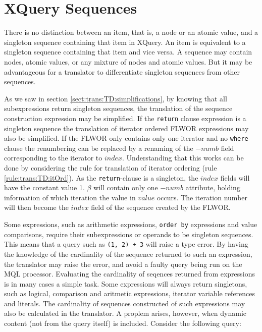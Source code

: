\section{XQuery Sequences}
\label{sect:disc:singelton}

There is no distinction between an item, that is, a node or an atomic value, and a singleton sequence containing
that item in XQuery. An item is equivalent to a singleton sequence containing that item and vice versa. A sequence
may contain nodes, atomic values, or any mixture of nodes and atomic values. But it may be advantageous for a
translator to differentiate singleton sequences from other sequences. 

As we saw in section \ref{sect:trans:TD:simplifications}, by knowing that all subexpressions return singleton
sequences, the translation of the sequence construction expression may be simplified. If the \texttt{return}
clause expression is a singleton sequence the translation of iterator ordered FLWOR expressions may also be
simplified. If the FLWOR only contains only one iterator and no \texttt{where}-clause the renumbering can be
replaced by a renaming of the $-numb$ field corresponding to the iterator to $index$. Understanding that this
works can be done by considering the rule for translation of iterator ordering (rule \ref{rule:trans:TD:itOrd}).
As the \texttt{return}-clause is a singleton, the $index$ fields will have the constant value 1. $\beta$ will
contain only one $-numb$ attribute, holding information of which iteration the value in $value$ occurs. The
iteration number will then become the $index$ field of the sequence created by the FLWOR.

Some expressions, such as arithmetic expressions, \texttt{order by} expressions and value comparisons, require
their subexpressions or operands to be singleton sequences. This means that a query such as \texttt{(1, 2) + 3}
will raise a type error. By having the knowledge of the cardinality of the sequence returned to such an
expression, the translator may raise the error, and avoid a faulty query being run on the MQL processor.
Evaluating the cardinality of seqences returned from expressions is in many cases a simple task. Some expressions
will always return singletons, such as logical, comparison and aritmetic expressions, iterator variable references
and literals. The cardinality of sequences constructed of such expressions may also be calculated in the
translator. A proplem arises, however, when dynamic content (not from the query itself) is included. Consider the
following query:

